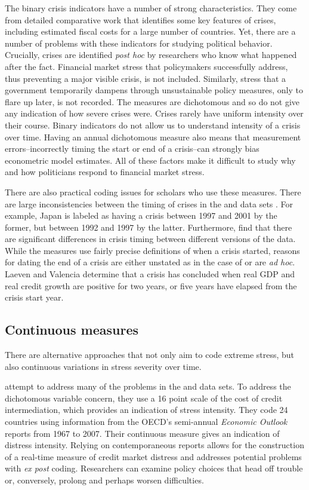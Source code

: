 \documentclass[]{article}
\begin{document}
The binary crisis indicators have a number of strong characteristics. They come from detailed comparative work that identifies some key features of crises, including estimated fiscal costs for a large number of countries. Yet, there are a number of problems with these indicators for studying political behavior. Crucially, crises are identified \emph{post hoc} by researchers who know what happened after the fact. Financial market stress that policymakers successfully address, thus preventing a major visible crisis, is not included. Similarly, stress that a government temporarily dampens through unsustainable policy measures, only to flare up later, is not recorded. The measures are dichotomous and so do not give any indication of how severe crises were. Crises rarely have uniform intensity over their course. Binary indicators do not allow us to understand intensity of a crisis over time.  Having an annual dichotomous measure also means that measurement errors--incorrectly timing the start or end of a crisis--can strongly bias econometric model estimates. All of these factors make it difficult to study why and how politicians respond to financial market stress.

There are also practical coding issues for scholars who use these measures. There are large inconsistencies between the timing of crises in the \cite{laeven2013} and \cite{Reinhart2009} data sets \citep{Chaudron2014}. For example, Japan is labeled as having a crisis between 1997 and 2001 by the former, but between 1992 and 1997 by the latter. Furthermore, \cite{GandrudHallerberg2015} find that there are significant differences in crisis timing between different versions of the \cite{laeven2013} data. While the measures use fairly precise definitions of when a crisis started, reasons for dating the end of a crisis are either unstated as in the case of \cite{Reinhart2009} or are \emph{ad hoc}. Laeven and Valencia \citeyearpar[footnote 19]{laeven2013} determine that a crisis has concluded when real GDP and real credit growth are positive for two years, or five years have elapsed from the crisis start year.

\subsection{Continuous measures}

There are alternative approaches that not only aim to code extreme stress, but also continuous variations in stress severity over time.

\cite{Romer2015} attempt to address many of the problems in the \cite{Reinhart2009} and \cite{laeven2013} data sets. To address the dichotomous variable concern, they use a 16 point scale of the cost of credit intermediation, which provides an indication of stress intensity. They code 24 countries using information from the OECD's semi-annual \emph{Economic Outlook} reports from 1967 to 2007. Their continuous measure gives an indication of distress intensity. Relying on contemporaneous reports allows for the construction of a real-time measure of credit market distress and addresses potential problems with \emph{ex post} coding. Researchers can examine policy choices that head off trouble or, conversely, prolong and perhaps worsen difficulties.
\end{document}
